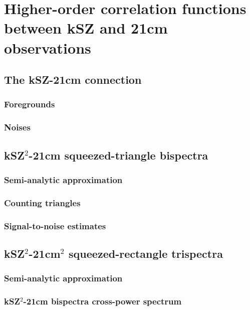 \chapter{Higher-order correlation functions between kSZ and 21cm observations}
\label{chapter:ksz_21cm}

\section{The kSZ-21cm connection}

\subsection{Foregrounds}

\subsection{Noises}

\section{kSZ$^2$-21cm squeezed-triangle bispectra}

\subsection{Semi-analytic approximation}

\subsection{Counting triangles}

\subsection{Signal-to-noise estimates}


\section{kSZ$^2$-21cm$^2$ squeezed-rectangle trispectra}

\subsection{Semi-analytic approximation}

\subsection{kSZ$^2$-21cm bispectra cross-power spectrum}